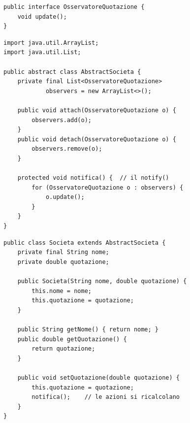 \noindent\begin{minipage}[t]{0.49\textwidth}
\begin{lstlisting}[style=java, name=OsservatoreQuotazione.java]
public interface OsservatoreQuotazione {
    void update();
}
\end{lstlisting}
\begin{lstlisting}[style=java, name=AbstractSocieta.java]
import java.util.ArrayList;
import java.util.List;

public abstract class AbstractSocieta {
    private final List<OsservatoreQuotazione>
            observers = new ArrayList<>();

    public void attach(OsservatoreQuotazione o) {
        observers.add(o);
    }
    public void detach(OsservatoreQuotazione o) {
        observers.remove(o);
    }

    protected void notifica() {  // il notify()
        for (OsservatoreQuotazione o : observers) {
            o.update();
        }
    }
}
\end{lstlisting}
\end{minipage}\hfill
\begin{minipage}[t]{0.49\textwidth}
\begin{lstlisting}[style=java, name=Societa.java]
public class Societa extends AbstractSocieta {
    private final String nome;
    private double quotazione;

    public Societa(String nome, double quotazione) {
        this.nome = nome;
        this.quotazione = quotazione;
    }

    public String getNome() { return nome; }
    public double getQuotazione() {
        return quotazione;
    }

    public void setQuotazione(double quotazione) {
        this.quotazione = quotazione;
        notifica();    // le azioni si ricalcolano
    }
}
\end{lstlisting}
\end{minipage}

